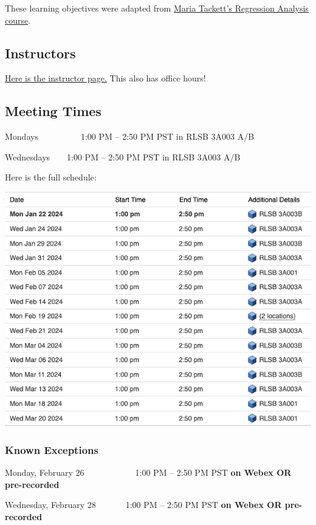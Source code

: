 \documentclass[
  letterpaper,
  DIV=11,
  numbers=noendperiod]{scrartcl}
\begin{document}
These learning objectives were adapted from
\href{https://maria-tackett.netlify.app/project/02_sta210/}{Maria
Tackett's Regression Analysis course}.

\hypertarget{instructors}{%
\subsection{Instructors}\label{instructors}}

\href{instructors.qmd}{Here is the instructor page.} This also has
office hours!

\hypertarget{meeting-times}{%
\subsection{Meeting Times}\label{meeting-times}}

Mondays~~~~~~~~~~1:00 PM -- 2:50 PM PST in RLSB 3A003 A/B

Wednesdays~~~~1:00 PM -- 2:50 PM PST in RLSB 3A003 A/B

Here is the full schedule:

\includegraphics{images/room_sched.png}

\hypertarget{known-exceptions}{%
\subsubsection{Known Exceptions}\label{known-exceptions}}

Monday, February 26~ ~ ~~ ~ ~ ~ ~1:00 PM -- 2:50 PM PST \textbf{on Webex
OR pre-recorded}

Wednesday, February 28~ ~ ~~ ~1:00 PM -- 2:50 PM PST \textbf{on Webex OR
pre-recorded}
\end{document}
